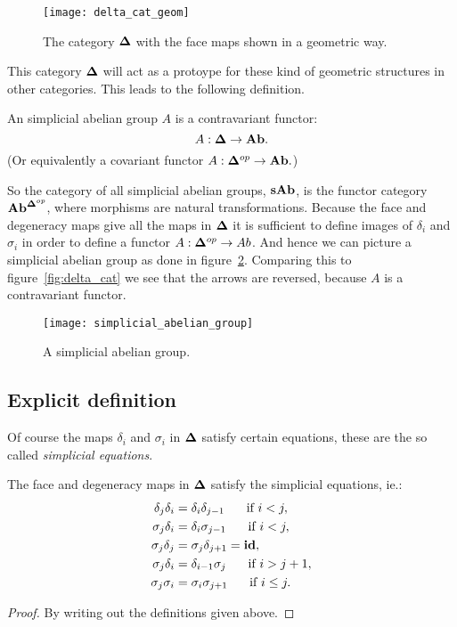 \begin{figure}
	\texttt{[image: delta\_cat\_geom]}
	\caption{The category $\mathbf{\Delta}$ with the face maps shown in a geometric way.}
	\label{fig:delta_cat_geom}
\end{figure}

This category $\mathbf{\Delta}$ will act as a protoype for these kind of geometric structures in other categories. This leads to the following definition.

\begin{definition}
	An simplicial abelian group $A$ is a contravariant functor:
	$$A: \mathbf{\Delta} \to \mathbf{Ab}.$$
	(Or equivalently a covariant functor $A: \mathbf{\Delta}^{op} \to \mathbf{Ab}.$)
\end{definition}

So the category of all simplicial abelian groups, $\mathbf{sAb}$, is the functor category $\mathbf{Ab}^{\mathbf{\Delta}^{op}}$, where morphisms are natural transformations. Because the face and degeneracy maps give all the maps in $\mathbf{\Delta}$ it is sufficient to define images of $\delta_i$ and $\sigma_i$ in order to define a functor $A: \mathbf{\Delta}^{op} \to Ab$. And hence we can picture a simplicial abelian group as done in figure~\ref{fig:simplicial_abelian_group}. Comparing this to figure~\ref{fig:delta_cat} we see that the arrows are reversed, because $A$ is a contravariant functor.

\begin{figure}
	\texttt{[image: simplicial\_abelian\_group]}
	\caption{A simplicial abelian group.}
	\label{fig:simplicial_abelian_group}
\end{figure}


\subsection{Explicit definition}
Of course the maps $\delta_i$ and $\sigma_i$ in $\mathbf{\Delta}$ satisfy certain equations, these are the so called \emph{simplicial equations}.

\begin{lemma}
	The face and degeneracy maps in $\mathbf{\Delta}$ satisfy the simplicial equations, ie.:
	\begin{align}
		\delta_j\delta_i &= \delta_i\delta_{j-1}  \hspace{0.5cm} \text{ if } i < j,\\
		\sigma_j\delta_i &= \delta_i\sigma_{j-1}  \hspace{0.5cm} \text{ if } i < j,\\
		\sigma_j\delta_j &= \sigma_j\delta_{j+1} = \mathbf{id},\\
		\sigma_j\delta_i &= \delta_{i-1}\sigma_j  \hspace{0.5cm} \text{ if } i > j+1,\\
		\sigma_j\sigma_i &= \sigma_i\sigma_{j+1}  \hspace{0.5cm} \text{ if } i \leq j.
	\end{align}
\end{lemma}
\begin{proof}
	By writing out the definitions given above.
\end{proof}

